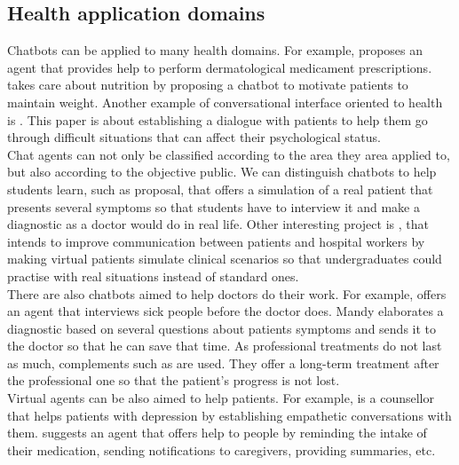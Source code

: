 \documentclass[12pt,english]{article}
\begin{document}
\subsection{Health application domains}

Chatbots can be applied to many health domains. For example, \cite{Alesanco2017185} proposes an agent that provides help to perform dermatological medicament prescriptions. \cite{BennetPraba20193470} takes care about nutrition by proposing a chatbot to motivate patients to maintain weight. Another example of conversational interface oriented to health is \cite{Falala-Sechet2019236}. This paper is about establishing a dialogue with patients to help them go through difficult situations that can affect their psychological status.\\

Chat agents can not only be classified according to the area they area applied to, but also according to the objective public. We can distinguish chatbots to help students learn, such as \cite{Lopez2008194} proposal, that offers a simulation of a real patient that presents several symptoms so that students have to interview it and make a diagnostic as a doctor would do in real life. Other interesting project is \cite{Shorey2019e14658}, that intends to improve communication between patients and hospital workers by making virtual patients simulate clinical scenarios so that undergraduates could practise with real situations instead of standard ones.\\

There are also chatbots aimed to help doctors do their work. For example, \cite{Ni201738} offers an agent that interviews sick people before the doctor does. Mandy elaborates a diagnostic based on several questions about patients symptoms and sends it to the doctor so that he can save that time. As professional treatments do not last as much, complements such as \cite{DAlfonso2017} are used. They offer a long-term treatment after the professional one so that the patient's progress is not lost. \\

Virtual agents can be also aimed to help patients. For example, \cite{Harilal2020349} is a counsellor that helps patients with depression by establishing empathetic conversations with them. \cite{Roca2020954} suggests an agent that offers help to people by reminding the intake of their medication, sending notifications to caregivers, providing summaries, etc.
\end{document}
